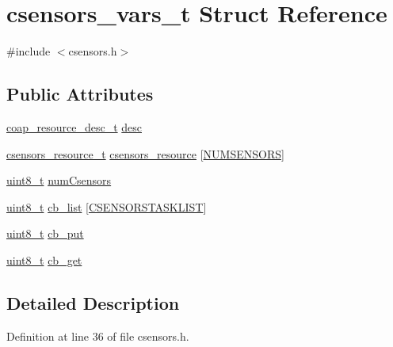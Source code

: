 \hypertarget{structcsensors__vars__t}{}\section{csensors\+\_\+vars\+\_\+t Struct Reference}
\label{structcsensors__vars__t}


{\ttfamily \#include $<$csensors.\+h$>$}

\subsection*{Public Attributes}
\begin{DoxyCompactItemize}
\item 
\hyperlink{structcoap__resource__desc__t}{coap\+\_\+resource\+\_\+desc\+\_\+t} \hyperlink{structcsensors__vars__t_a7dbe71d9880e474d0a8525b4af4d7fe4}{desc}
\item 
\hyperlink{structcsensors__resource__t}{csensors\+\_\+resource\+\_\+t} \hyperlink{structcsensors__vars__t_ab3ef42b0b7249d8cb1b808e32224798d}{csensors\+\_\+resource} \mbox{[}\hyperlink{sensors_8h_a464fdb7834b9b30e4c1dfdf1134cd8cb}{N\+U\+M\+S\+E\+N\+S\+O\+RS}\mbox{]}
\item 
\hyperlink{_p_e___types_8h_aba7bc1797add20fe3efdf37ced1182c5}{uint8\+\_\+t} \hyperlink{structcsensors__vars__t_a33e2d4aab034c26735676e54f7ffe7cc}{num\+Csensors}
\item 
\hyperlink{_p_e___types_8h_aba7bc1797add20fe3efdf37ced1182c5}{uint8\+\_\+t} \hyperlink{structcsensors__vars__t_a09f8c0d295debc6912e1a877078f3f10}{cb\+\_\+list} \mbox{[}\hyperlink{group__csensors_gaaf2582adb186074d7ca5110826e19687}{C\+S\+E\+N\+S\+O\+R\+S\+T\+A\+S\+K\+L\+I\+ST}\mbox{]}
\item 
\hyperlink{_p_e___types_8h_aba7bc1797add20fe3efdf37ced1182c5}{uint8\+\_\+t} \hyperlink{structcsensors__vars__t_a2e2bebec9c28a67d5b3a6e0d53d6a439}{cb\+\_\+put}
\item 
\hyperlink{_p_e___types_8h_aba7bc1797add20fe3efdf37ced1182c5}{uint8\+\_\+t} \hyperlink{structcsensors__vars__t_a2fc3b5c404a9668b5a5e3fb66ed01180}{cb\+\_\+get}
\end{DoxyCompactItemize}


\subsection{Detailed Description}


Definition at line 36 of file csensors.\+h.



